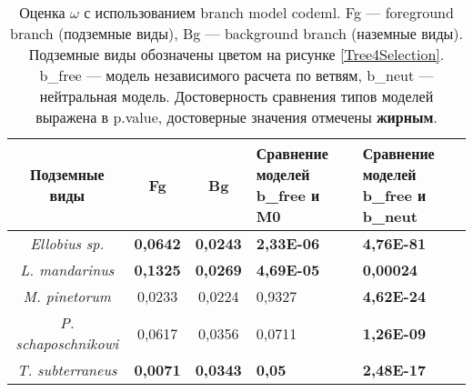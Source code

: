 \begin{table}[h!]
	\caption{Оценка $\omega$ с использованием branch model codeml. Fg --- foreground branch (подземные виды), Bg --- background branch (наземные виды). Подземные виды обозначены цветом на рисунке \ref{Tree4Selection}. b\_free --- модель независимого расчета по ветвям, b\_neut --- нейтральная модель. Достоверность сравнения типов моделей выражена в p.value, достоверные значения отмечены \textbf{жирным}.}\label{PAMLtable}
	\vspace{5mm}
	
\begin{center}
\begin{tabular}{|c|c|c|p{4.5cm}|p{4.5cm}|}
	\hline 
\textbf{Подземные виды} & \textbf{Fg} & \textbf{Bg} & \textbf{Сравнение моделей b\_free и M0} & \textbf{Сравнение моделей b\_free и b\_neut}\\ \hline
\textit{Ellobius sp.} & \textbf{0,0642} & \textbf{0,0243} & \textbf{2,33E-06} & \textbf{4,76E-81}\\ \hline
\textit{L. mandarinus} & \textbf{0,1325} & \textbf{0,0269} & \textbf{4,69E-05} & \textbf{0,00024}\\ \hline
\textit{M. pinetorum} & 0,0233 & 0,0224 & 0,9327 & \textbf{4,62E-24}\\ \hline
\textit{P. schaposchnikowi} & 0,0617 & 0,0356 & 0,0711 & \textbf{1,26E-09}\\ \hline
\textit{T. subterraneus} & \textbf{0,0071} & \textbf{0,0343} & \textbf{0,05} & \textbf{2,48E-17}\\ \hline
\end{tabular} 
\end{center}
\end{table}

\clearpage


